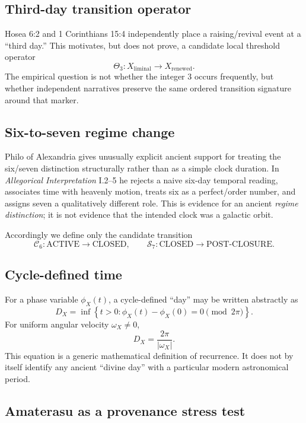 \subsection{Third-day transition operator}

Hosea 6:2 and 1 Corinthians 15:4 independently place a raising/revival event
at a ``third day.'' This motivates, but does not prove, a candidate local
threshold operator
\[
\Theta_3:
X_{\mathrm{liminal}}
\longrightarrow
X_{\mathrm{renewed}}.
\]
The empirical question is not whether the integer \(3\) occurs frequently,
but whether independent narratives preserve the same ordered transition
signature around that marker.

\subsection{Six-to-seven regime change}

Philo of Alexandria gives unusually explicit ancient support for treating
the six/seven distinction structurally rather than as a simple clock
duration. In \emph{Allegorical Interpretation} I.2--5 he rejects a naive
six-day temporal reading, associates time with heavenly motion, treats six
as a perfect/order number, and assigns seven a qualitatively different
role. This is evidence for an ancient \emph{regime distinction}; it is not
evidence that the intended clock was a galactic orbit.

Accordingly we define only the candidate transition
\[
\mathcal C_6:
\mathrm{ACTIVE}
\longrightarrow
\mathrm{CLOSED},
\qquad
\mathcal S_7:
\mathrm{CLOSED}
\longrightarrow
\mathrm{POST\text{-}CLOSURE}.
\]

\subsection{Cycle-defined time}

For a phase variable \(\phi_X(t)\), a cycle-defined ``day'' may be written
abstractly as
\[
D_X=\inf\left\{
t>0:
\phi_X(t)-\phi_X(0)=0 \pmod{2\pi}
\right\}.
\]
For uniform angular velocity \(\omega_X\neq0\),
\[
D_X=\frac{2\pi}{|\omega_X|}.
\]
This equation is a generic mathematical definition of recurrence. It does
not by itself identify any ancient ``divine day'' with a particular modern
astronomical period.

\subsection{Amaterasu as a provenance stress test}

